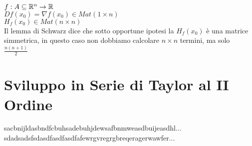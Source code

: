 \observation
$f:A\subseteq \mathbb{R}^n\rightarrow \mathbb{R}$\\
$Df(x_0)=\nabla f(x_0) \in Mat(1\times n)$\\
$H_f(x_0)\in Mat(n\times n)$\\
Il lemma di Schwarz dice che sotto opportune ipotesi la $H_f(x_0)$ è una matrice simmetrica, in questo caso non dobbiamo calcolare $n\times n$ termini, ma solo $\frac{n(n+1)}{2}$

\section{Sviluppo in Serie di Taylor al II Ordine}
sacbnijldasbndfcbuhsadebuhjdewsafbnmweasdbuijeasdhl...\\
sdadsadsfsdasdfasdfasdfafewrgvregrgbreqeragerwawfer...\\

